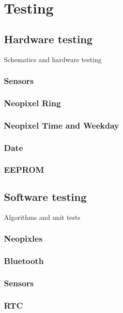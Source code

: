 \chapter{Testing}

\section{Hardware  testing}
Schematics and hardware testing
\subsection{Sensors}
\subsection{Neopixel Ring}
\subsection{Neopixel Time and Weekday} 
\subsection{Date}
\subsection{EEPROM}


\section{Software testing}
Algorithms and unit tests
\subsection{Neopixles}
\subsection{Bluetooth}
\subsection{Sensors} 
\subsection{RTC}
